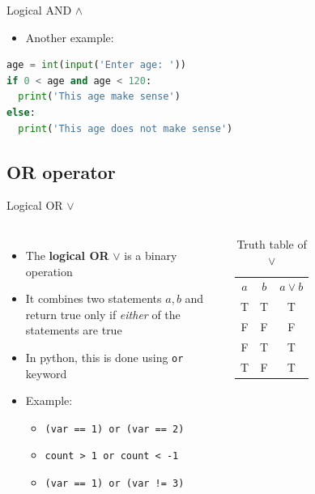 \documentclass[10pt,xcolor={table,dvipsnames},t]{beamer}
\begin{document}
\begin{frame}[fragile]{Logical AND $\land$}
  \begin{itemize}
    \item Another example:
  \end{itemize}
\begin{lstlisting}[language=python]
age = int(input('Enter age: '))
if 0 < age and age < 120:
  print('This age make sense')
else:
  print('This age does not make sense')
\end{lstlisting}
\end{frame}


\subsection{OR operator}
\begin{frame}{Logical OR $\lor$}
  \begin{columns}
    \begin{itemize}
      \item The \textbf{logical OR} $\lor$ is a binary operation
      \item It combines two statements $a,b$ and return true only if \textit{either} of the statements are true 
      \item In python, this is done using \texttt{or} keyword
      \item Example:
      \begin{itemize}
        \item \texttt{(var == 1) or (var == 2)}
        \item \texttt{count > 1 or count < -1}
        \item \texttt{(var == 1) or (var != 3)}
      \end{itemize}
    \end{itemize}
    \begin{table}[]
      \begin{tabular}{ccc}
      $a$ & $b$ & $a\lor b$  \\
      T & T & T \\
      F & F & F \\
      F & T & T\\
      T & F & T
      \end{tabular}
      \caption{Truth table of $\lor$}
      \end{table}
  \end{columns}
\end{frame}
\end{document}
